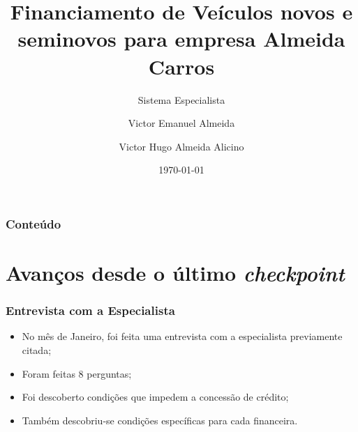 \documentclass[12pt]{beamer}
\author[Victor * Almeida *]{Victor Emanuel Almeida \and Victor Hugo Almeida Alicino}
\title[Financiamento de veículos]{Financiamento de Veículos novos e seminovos para empresa Almeida Carros}
\subtitle{Sistema Especialista}
\date{\today}
\institute{UNIOESTE}
\begin{document}
\frame{\titlepage}

\begin{frame}
    \frametitle{Conteúdo}
    \tableofcontents
\end{frame}

\section{Avanços desde o último \textit{checkpoint}}

\begin{frame}
    \frametitle{Entrevista com a Especialista}
    \begin{itemize}
        \item No mês de Janeiro, foi feita uma entrevista com a especialista previamente citada;
        \item Foram feitas 8 perguntas;
        \item Foi descoberto condições que impedem a concessão de crédito;
        \item Também descobriu-se condições específicas para cada financeira.
    \end{itemize}
\end{frame}
\end{document}
